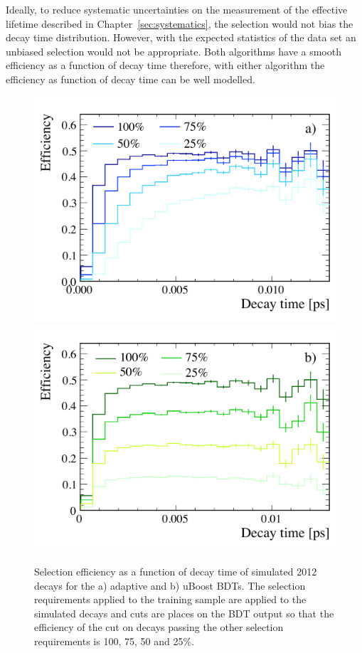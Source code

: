 Ideally, to reduce systematic uncertainties on the measurement of the effective lifetime described in Chapter~\ref{sec:systematics}, the selection would not bias the decay time distribution. However, with the expected statistics of the data set an unbiased selection would not be appropriate. Both algorithms have a smooth efficiency as a function of decay time therefore, with either algorithm the efficiency as function of decay time can be well modelled. 
\begin{figure}[tbp]
    \centering
        \includegraphics[width=0.49 \textwidth]{./Figs/Selection/BDT_acceptances.pdf}
       \includegraphics[width=0.49 \textwidth]{./Figs/Selection/uBoost_accpt.pdf}
    \caption{Selection efficiency as a function of decay time of simulated 2012 \bsmumu decays for the a) adaptive and b) uBoost BDTs. The selection requirements applied to the training sample are applied to the simulated decays and cuts are places on the BDT output so that the efficiency of the cut on decays passing the other selection requirements is 100, 75, 50 and 25$\%$.}%
    \label{fig:accptsELBDTs}
\end{figure}

